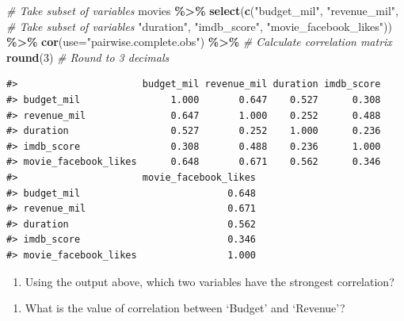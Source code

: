 \documentclass[
]{report}
\newenvironment{Shaded}{\begin{snugshade}}{\end{snugshade}}
\newcommand{\CommentTok}[1]{\textcolor[rgb]{0.56,0.35,0.01}{\textit{#1}}}
\newcommand{\DataTypeTok}[1]{\textcolor[rgb]{0.13,0.29,0.53}{#1}}
\newcommand{\DecValTok}[1]{\textcolor[rgb]{0.00,0.00,0.81}{#1}}
\newcommand{\KeywordTok}[1]{\textcolor[rgb]{0.13,0.29,0.53}{\textbf{#1}}}
\newcommand{\NormalTok}[1]{#1}
\newcommand{\OperatorTok}[1]{\textcolor[rgb]{0.81,0.36,0.00}{\textbf{#1}}}
\newcommand{\StringTok}[1]{\textcolor[rgb]{0.31,0.60,0.02}{#1}}
\providecommand{\tightlist}{%
  \setlength{\itemsep}{0pt}\setlength{\parskip}{0pt}}
\begin{document}
\begin{Shaded}
\begin{Highlighting}[]
\CommentTok{\# Take subset of variables}
\NormalTok{movies }\OperatorTok{\%\textgreater{}\%}
\StringTok{  }\KeywordTok{select}\NormalTok{(}\KeywordTok{c}\NormalTok{(}\StringTok{"budget\_mil"}\NormalTok{, }\StringTok{"revenue\_mil"}\NormalTok{,  }\CommentTok{\# Take subset of variables}
           \StringTok{"duration"}\NormalTok{, }\StringTok{"imdb\_score"}\NormalTok{, }
           \StringTok{"movie\_facebook\_likes"}\NormalTok{)) }\OperatorTok{\%\textgreater{}\%}
\StringTok{  }\KeywordTok{cor}\NormalTok{(}\DataTypeTok{use=}\StringTok{"pairwise.complete.obs"}\NormalTok{) }\OperatorTok{\%\textgreater{}\%}\StringTok{ }\CommentTok{\# Calculate correlation matrix}
\StringTok{  }\KeywordTok{round}\NormalTok{(}\DecValTok{3}\NormalTok{)  }\CommentTok{\# Round to 3 decimals}
\end{Highlighting}
\end{Shaded}

\begin{verbatim}
#>                      budget_mil revenue_mil duration imdb_score
#> budget_mil                1.000       0.647    0.527      0.308
#> revenue_mil               0.647       1.000    0.252      0.488
#> duration                  0.527       0.252    1.000      0.236
#> imdb_score                0.308       0.488    0.236      1.000
#> movie_facebook_likes      0.648       0.671    0.562      0.346
#>                      movie_facebook_likes
#> budget_mil                          0.648
#> revenue_mil                         0.671
#> duration                            0.562
#> imdb_score                          0.346
#> movie_facebook_likes                1.000
\end{verbatim}

\begin{enumerate}
\def\labelenumi{\arabic{enumi}.}
\setcounter{enumi}{4}
\tightlist
\item
  Using the output above, which two variables have the strongest correlation?
\end{enumerate}

\vspace{0.5in}

\begin{enumerate}
\def\labelenumi{\arabic{enumi}.}
\setcounter{enumi}{5}
\tightlist
\item
  What is the value of correlation between `Budget' and `Revenue'?
\end{enumerate}
\end{document}
